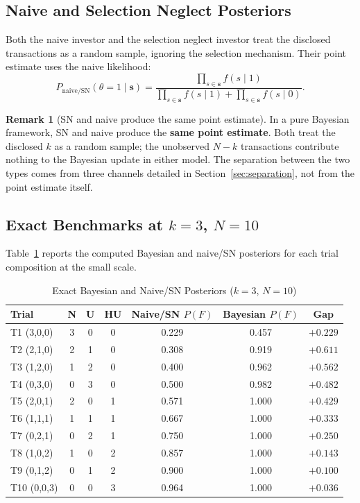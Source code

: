 \documentclass[12pt]{article}
\theoremstyle{definition}
\newtheorem{remark}{Remark}
\begin{document}
\subsection{Naive and Selection Neglect Posteriors}

Both the naive investor and the selection neglect investor treat the disclosed transactions as a random sample, ignoring the selection mechanism. Their point estimate uses the naive likelihood:
\begin{equation}
P_{\text{naive/SN}}(\theta = 1 \mid \mathbf{s}) = \frac{\prod_{s \in \mathbf{s}} f(s \mid 1)}{\prod_{s \in \mathbf{s}} f(s \mid 1) + \prod_{s \in \mathbf{s}} f(s \mid 0)}.
\label{eq:naive_posterior}
\end{equation}

\begin{remark}[SN and naive produce the same point estimate]
\label{rmk:same_point}
In a pure Bayesian framework, SN and naive produce the \textbf{same point estimate}. Both treat the disclosed $k$ as a random sample; the unobserved $N - k$ transactions contribute nothing to the Bayesian update in either model. The separation between the two types comes from three channels detailed in Section~\ref{sec:separation}, not from the point estimate itself.
\end{remark}

\subsection{Exact Benchmarks at $k=3$, $N=10$}

Table~\ref{tab:benchmarks_small} reports the computed Bayesian and naive/SN posteriors for each trial composition at the small scale.

\begin{table}[h!]
\centering
\caption{Exact Bayesian and Naive/SN Posteriors ($k=3$, $N=10$)}
\label{tab:benchmarks_small}
\begin{tabular}{l ccc cc c}
\toprule
Trial & N & U & HU & Naive/SN $P(F)$ & Bayesian $P(F)$ & Gap \\
\midrule
T1 (3,0,0)   & 3 & 0 & 0 & 0.229 & 0.457 & $+0.229$ \\
T2 (2,1,0)   & 2 & 1 & 0 & 0.308 & 0.919 & $+0.611$ \\
T3 (1,2,0)   & 1 & 2 & 0 & 0.400 & 0.962 & $+0.562$ \\
T4 (0,3,0)   & 0 & 3 & 0 & 0.500 & 0.982 & $+0.482$ \\
T5 (2,0,1)   & 2 & 0 & 1 & 0.571 & 1.000 & $+0.429$ \\
T6 (1,1,1)   & 1 & 1 & 1 & 0.667 & 1.000 & $+0.333$ \\
T7 (0,2,1)   & 0 & 2 & 1 & 0.750 & 1.000 & $+0.250$ \\
T8 (1,0,2)   & 1 & 0 & 2 & 0.857 & 1.000 & $+0.143$ \\
T9 (0,1,2)   & 0 & 1 & 2 & 0.900 & 1.000 & $+0.100$ \\
T10 (0,0,3)  & 0 & 0 & 3 & 0.964 & 1.000 & $+0.036$ \\
\bottomrule
\end{tabular}
\end{table}
\end{document}
